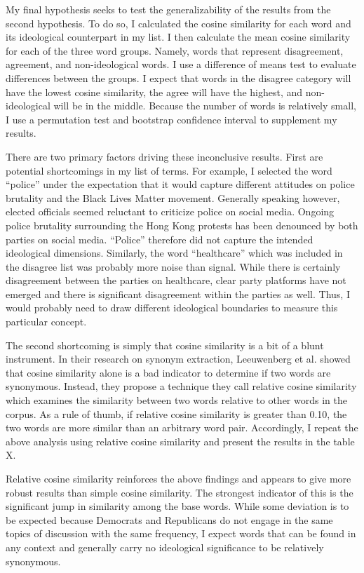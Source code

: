 \documentclass[../embeddings.tex]{subfiles}
\begin{document}
My final hypothesis seeks to test the generalizability of the results from the second hypothesis. To do so, I calculated the cosine similarity for each word and its ideological counterpart in my list. I then calculate the mean cosine similarity for each of the three word groups. Namely, words that represent disagreement, agreement, and non-ideological words. I use a difference of means test to evaluate differences between the groups. I expect that words in the disagree category will have the lowest cosine similarity, the agree will have the highest, and non-ideological will be in the middle. Because the number of words is relatively small, I use a permutation test and bootstrap confidence interval to supplement my results.

There are two primary factors driving these inconclusive results. First are potential shortcomings in my list of terms. For example, I selected the word “police” under the expectation that it would capture different attitudes on police brutality and the Black Lives Matter movement. Generally speaking however, elected officials seemed reluctant to criticize police on social media. Ongoing police brutality surrounding the Hong Kong protests has been denounced by both parties on social media. “Police” therefore did not capture the intended ideological dimensions. Similarly, the word “healthcare” which was included in the disagree list was probably more noise than signal. While there is certainly disagreement between the parties on healthcare, clear party platforms have not emerged and there is significant disagreement within the parties as well. Thus, I would probably need to draw different ideological boundaries to measure this particular concept. 

The second shortcoming is simply that cosine similarity is a bit of a blunt instrument. In their research on synonym extraction, Leeuwenberg et al. showed that cosine similarity alone is a bad indicator to determine if two words are synonymous. Instead, they propose a technique they call relative cosine similarity which examines the similarity between two words relative to other words in the corpus. As a rule of thumb, if relative cosine similarity is greater than 0.10, the two words are more similar than an arbitrary word pair. Accordingly, I repeat the above analysis using relative cosine similarity and present the results in the table X.

Relative cosine similarity reinforces the above findings and appears to give more robust results than simple cosine similarity. The strongest indicator of this is the significant jump in similarity among the base words. While some deviation is to be expected because Democrats and Republicans do not engage in the same topics of discussion with the same frequency, I expect words that can be found in any context and generally carry no ideological significance to be relatively synonymous.
\end{document}
